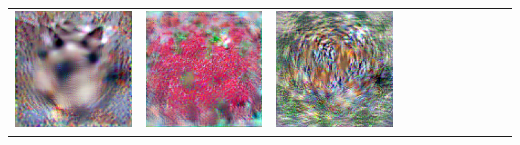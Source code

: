 \documentclass[main.tex]{subfiles}
\begin{document}
{\begin{center}
\begin{tabular}{ccccccccccc}
    \includegraphics[align=c,width=\coverwidth\linewidth]{figures/cover/imagenet/siamese_cat_0.pdf} &
    \includegraphics[align=c,width=\coverwidth\linewidth]{figures/cover/imagenet/strawberry_0.pdf} &
    \includegraphics[align=c,width=\coverwidth\linewidth]{figures/cover/imagenet/tiger_0.pdf} \\[7.8ex]

\end{tabular}
\end{center}}
\end{document}
